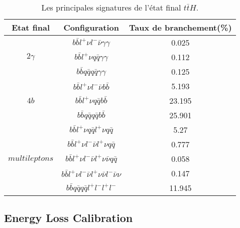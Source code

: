 \begin{table}[H]
  \centering
  \begin{tabular}{|c|c|c|}
    \hline Etat final & Configuration & Taux de branchement(\%) \\
    \hline 
    \multirow{3}{*}{$2\gamma$} & $b\bar{b}l^{+}{\nu}l^{-}\bar{\nu}\gamma\gamma$ & 0.025  \rule[-7pt]{0pt}{20pt}\\
      & $b\bar{b}l^{+}{\nu}q\bar{q}\gamma\gamma$ & 0.112  \rule[-7pt]{0pt}{20pt}\\
     $H\rightarrow\gamma\gamma$  & $b\bar{b}q\bar{q}q\bar{q}\gamma\gamma$ & 0.125  \rule[-7pt]{0pt}{20pt}\\
    \hline
    \multirow{3}{*}{$4b$} &  $b\bar{b}l^{+}{\nu}l^{-}\bar{\nu}b\bar{b}$ & 5.193  \rule[-7pt]{0pt}{20pt}\\
      & $b\bar{b}l^{+}{\nu}q\bar{q}b\bar{b}$ & 23.195  \rule[-7pt]{0pt}{20pt}\\
     $H\rightarrow b\bar{b}$  & $b\bar{b}q\bar{q}q\bar{q}b\bar{b}$ & 25.901  \rule[-7pt]{0pt}{20pt}\\
    \hline
    \multirow{5}{*}{$multileptons$} &  $b\bar{b}l^{+}{\nu}q\bar{q}l^{+}{\nu}q\bar{q}$ & 5.27  \rule[-7pt]{0pt}{20pt}\\
      & $b\bar{b}l^{+}{\nu}l^{-}\bar{\nu}l^{+}{\nu}q\bar{q}$ & 0.777  \rule[-7pt]{0pt}{20pt}\\
      & $b\bar{b}l^{+}{\nu}l^{-}\bar{\nu}l^{+}{\nu}\bar{\nu}q\bar{q}$ & 0.058  \rule[-7pt]{0pt}{20pt}\\
    $H\rightarrow WW, ZZ, \tau\tau$ & $b\bar{b}l^{+}{\nu}l^{-}\bar{\nu}l^{+}{\nu}\bar{\nu}l^{-}\bar{\nu}{\nu}$ & 0.147  \rule[-7pt]{0pt}{20pt}\\
      & $b\bar{b}q\bar{q}q\bar{q}l^{+}l^{-}l^{+}l^{-}$ & 11.945  \rule[-7pt]{0pt}{20pt}\\
    \hline    
  \end{tabular}
  \caption{Les principales signatures de l'\'etat final $t\bar{t}H$.}
  \label{table:3.1}
\end{table}

\subsection{Energy Loss Calibration}

